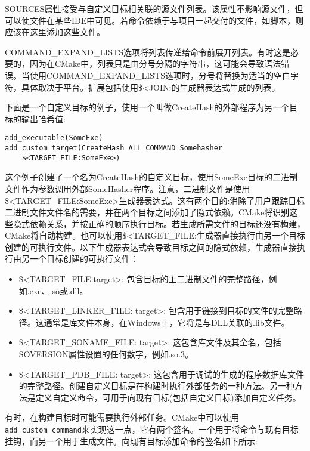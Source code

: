 SOURCES属性接受与自定义目标相关联的源文件列表。该属性不影响源文件，但可以使文件在某些IDE中可见。若命令依赖于与项目一起交付的文件，如脚本，则应该在这里添加这些文件。

COMMAND\_EXPAND\_LISTS选项将列表传递给命令前展开列表。有时这是必要的，因为在CMake中，列表只是由分号分隔的字符串，这可能会导致语法错误。当使用COMMAND\_EXPAND\_LISTS选项时，分号将替换为适当的空白字符，具体取决于平台。扩展包括使用\$<JOIN:的生成器表达式生成的列表。

下面是一个自定义目标的例子，使用一个叫做CreateHash的外部程序为另一个目标的输出哈希值:

\begin{lstlisting}[style=styleCMake]
add_executable(SomeExe)
add_custom_target(CreateHash ALL COMMAND Somehasher
	$<TARGET_FILE:SomeExe>)
\end{lstlisting}

这个例子创建了一个名为CreateHash的自定义目标，使用SomeExe目标的二进制文件作为参数调用外部SomeHasher程序。注意，二进制文件是使用\$<TARGET\_FILE:SomeExe>生成器表达式。这有两个目的:消除了用户跟踪目标二进制文件文件名的需要，并在两个目标之间添加了隐式依赖。CMake将识别这些隐式依赖关系，并按正确的顺序执行目标。若生成所需文件的目标还没有构建，CMake将自动构建。也可以使用\$<TARGET\_FILE:生成器直接执行由另一个目标创建的可执行文件。以下生成器表达式会导致目标之间的隐式依赖，生成器直接执行由另一个目标创建的可执行文件：

\begin{itemize}
\item 
\$<TARGET\_FILE:target>: 包含目标的主二进制文件的完整路径，例如.exe、.so或.dll。

\item 
\$<TARGET\_LINKER\_FILE: target>: 包含用于链接到目标的文件的完整路径。这通常是库文件本身，在Windows上，它将是与DLL关联的.lib文件。

\item 
\$<TARGET\_SONAME\_FILE: target>: 这包含库文件及其全名，包括SOVERSION属性设置的任何数字，例如.so.3。

\item
\$<TARGET\_PDB\_FILE: target>: 这包含用于调试的生成的程序数据库文件的完整路径。创建自定义目标是在构建时执行外部任务的一种方法。另一种方法是定义自定义命令，可用于向现有目标(包括自定义目标)添加自定义任务。
\end{itemize}


有时，在构建目标时可能需要执行外部任务。CMake中可以使用\texttt{add\_custom\_command}来实现这一点，它有两个签名。一个用于将命令与现有目标挂钩，而另一个用于生成文件。向现有目标添加命令的签名如下所示:

